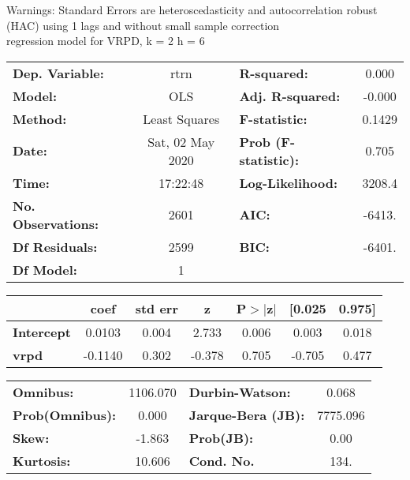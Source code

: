 Warnings: \newline
 [1] Standard Errors are heteroscedasticity and autocorrelation robust (HAC) using 1 lags and without small sample correction\\ 

regression model for VRPD, k = 2 h = 6\begin{center}
\begin{tabular}{lclc}
\toprule
\textbf{Dep. Variable:}    &       rtrn       & \textbf{  R-squared:         } &     0.000   \\
\textbf{Model:}            &       OLS        & \textbf{  Adj. R-squared:    } &    -0.000   \\
\textbf{Method:}           &  Least Squares   & \textbf{  F-statistic:       } &    0.1429   \\
\textbf{Date:}             & Sat, 02 May 2020 & \textbf{  Prob (F-statistic):} &    0.705    \\
\textbf{Time:}             &     17:22:48     & \textbf{  Log-Likelihood:    } &    3208.4   \\
\textbf{No. Observations:} &        2601      & \textbf{  AIC:               } &    -6413.   \\
\textbf{Df Residuals:}     &        2599      & \textbf{  BIC:               } &    -6401.   \\
\textbf{Df Model:}         &           1      & \textbf{                     } &             \\
\bottomrule
\end{tabular}
\begin{tabular}{lcccccc}
                   & \textbf{coef} & \textbf{std err} & \textbf{z} & \textbf{P$> |$z$|$} & \textbf{[0.025} & \textbf{0.975]}  \\
\midrule
\textbf{Intercept} &       0.0103  &        0.004     &     2.733  &         0.006        &        0.003    &        0.018     \\
\textbf{vrpd}      &      -0.1140  &        0.302     &    -0.378  &         0.705        &       -0.705    &        0.477     \\
\bottomrule
\end{tabular}
\begin{tabular}{lclc}
\textbf{Omnibus:}       & 1106.070 & \textbf{  Durbin-Watson:     } &    0.068  \\
\textbf{Prob(Omnibus):} &   0.000  & \textbf{  Jarque-Bera (JB):  } & 7775.096  \\
\textbf{Skew:}          &  -1.863  & \textbf{  Prob(JB):          } &     0.00  \\
\textbf{Kurtosis:}      &  10.606  & \textbf{  Cond. No.          } &     134.  \\
\bottomrule
\end{tabular}
\end{center}

